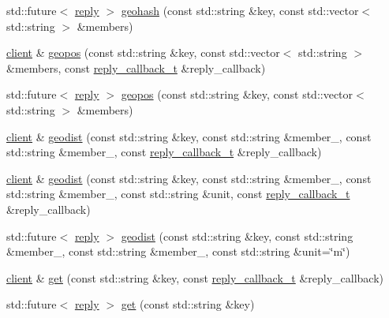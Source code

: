 \begin{DoxyCompactItemize}
\item 
std\+::future$<$ \hyperlink{classcpp__redis_1_1reply}{reply} $>$ \hyperlink{classcpp__redis_1_1client_ac421d4e696a67c1295a6b55ceaeab680}{geohash} (const std\+::string \&key, const std\+::vector$<$ std\+::string $>$ \&members)
\item 
\hyperlink{classcpp__redis_1_1client}{client} \& \hyperlink{classcpp__redis_1_1client_ae4bba1470cf357a8c4d1f8360a9c8b79}{geopos} (const std\+::string \&key, const std\+::vector$<$ std\+::string $>$ \&members, const \hyperlink{classcpp__redis_1_1client_a061a1140d36d2eaeda82b09a0bb3f9f2}{reply\+\_\+callback\+\_\+t} \&reply\+\_\+callback)
\item 
std\+::future$<$ \hyperlink{classcpp__redis_1_1reply}{reply} $>$ \hyperlink{classcpp__redis_1_1client_a8166870c7f3b6c5152eb85a233d78368}{geopos} (const std\+::string \&key, const std\+::vector$<$ std\+::string $>$ \&members)
\item 
\hyperlink{classcpp__redis_1_1client}{client} \& \hyperlink{classcpp__redis_1_1client_a56df27bbe73c7738854150359ba39958}{geodist} (const std\+::string \&key, const std\+::string \&member\+\_, const std\+::string \&member\+\_, const \hyperlink{classcpp__redis_1_1client_a061a1140d36d2eaeda82b09a0bb3f9f2}{reply\+\_\+callback\+\_\+t} \&reply\+\_\+callback)
\item 
\hyperlink{classcpp__redis_1_1client}{client} \& \hyperlink{classcpp__redis_1_1client_ade755123f2de81995df6a66a363a0dfb}{geodist} (const std\+::string \&key, const std\+::string \&member\+\_, const std\+::string \&member\+\_, const std\+::string \&unit, const \hyperlink{classcpp__redis_1_1client_a061a1140d36d2eaeda82b09a0bb3f9f2}{reply\+\_\+callback\+\_\+t} \&reply\+\_\+callback)
\item 
std\+::future$<$ \hyperlink{classcpp__redis_1_1reply}{reply} $>$ \hyperlink{classcpp__redis_1_1client_a32c21dc5c2b8187c33e22e695c2f1555}{geodist} (const std\+::string \&key, const std\+::string \&member\+\_, const std\+::string \&member\+\_, const std\+::string \&unit=\char`\"{}m\char`\"{})
\item 
\hyperlink{classcpp__redis_1_1client}{client} \& \hyperlink{classcpp__redis_1_1client_a1521d8c4c751d970c446aae7ccf8cc35}{get} (const std\+::string \&key, const \hyperlink{classcpp__redis_1_1client_a061a1140d36d2eaeda82b09a0bb3f9f2}{reply\+\_\+callback\+\_\+t} \&reply\+\_\+callback)
\item 
std\+::future$<$ \hyperlink{classcpp__redis_1_1reply}{reply} $>$ \hyperlink{classcpp__redis_1_1client_af2f987e43e139b21df2138a541b766f8}{get} (const std\+::string \&key)

\end{DoxyCompactItemize}
